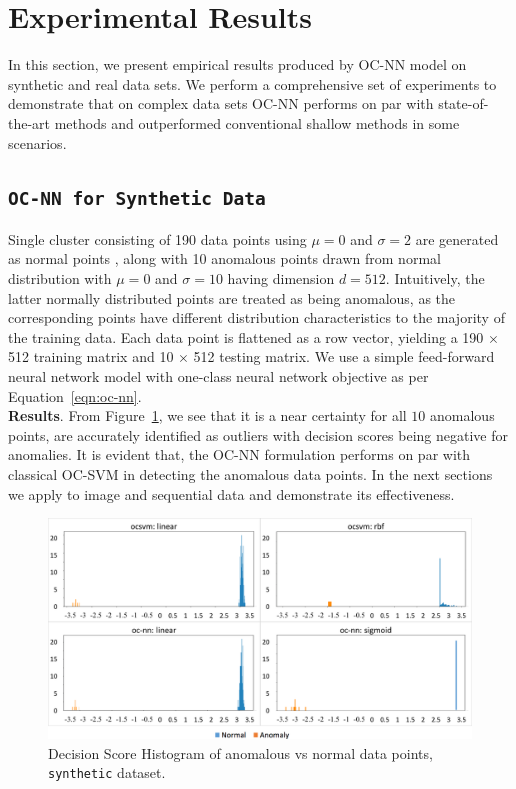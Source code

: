 \section{Experimental Results}
\label{sec:ocnn_experiment-results}

In this section, we present empirical results produced by OC-NN model on synthetic and real data sets. We perform a comprehensive set of experiments to demonstrate that on complex data sets OC-NN performs on par with state-of-the-art methods and outperformed conventional shallow methods in some scenarios.
\subsection{\tt OC-NN for Synthetic Data}
Single cluster consisting of 190 data points using $\mu=0$ and $\sigma = 2$ are generated as normal points , along with 10 anomalous points drawn from normal distribution with $\mu=0$ and $\sigma = 10$ having  dimension $d=512$. Intuitively, the latter normally distributed points are treated as being anomalous, as the corresponding points have different distribution characteristics to the majority of the training data. Each data point is flattened as a row vector, yielding a 190 $\times$ 512 training matrix and 10 $\times$ 512 testing matrix. We use a simple feed-forward neural network model with one-class neural network  objective as per Equation~\ref{eqn:oc-nn}.\\
\textbf{Results}.
From Figure~\ref{fig:synthetic-histogram}, we see that it is a near certainty for all $10$ anomalous points, are accurately identified as outliers with decision scores being negative for anomalies. It is evident that, the OC-NN formulation performs on par with classical OC-SVM in detecting the anomalous data points. In the next sections we apply to image and sequential data and demonstrate its effectiveness.


\begin{figure}
    \centering
    \includegraphics[scale=0.38]{images/s1}
    \caption{Decision Score Histogram of anomalous vs normal data points, {\tt synthetic} dataset.}
    \label{fig:synthetic-histogram}
\end{figure}



